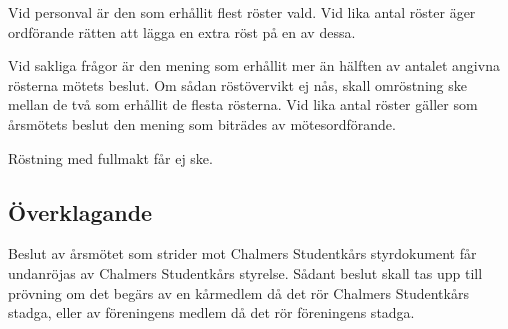 Vid personval är den som erhållit flest röster vald. Vid lika antal röster äger ordförande rätten att lägga en extra röst på en av dessa.

Vid sakliga frågor är den mening som erhållit mer än hälften av antalet angivna rösterna mötets beslut. Om sådan röstövervikt ej nås, skall omröstning ske mellan de två som erhållit de flesta rösterna. Vid lika antal röster gäller som årsmötets beslut den mening som biträdes av mötesordförande.

Röstning med fullmakt får ej ske.

\subsection{Överklagande}
Beslut av årsmötet som strider mot Chalmers Studentkårs styrdokument får undanröjas av Chalmers Studentkårs styrelse. Sådant beslut skall tas upp till prövning om det begärs av en kårmedlem då det rör Chalmers Studentkårs stadga, eller av föreningens medlem då det rör föreningens stadga.